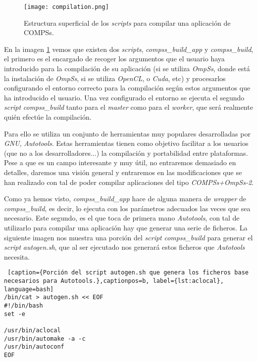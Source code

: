 \bigskip
\begin{figure}[h]
	\centering 
	\caption{Estructura superficial de los \textit{scripts} para compilar una aplicación de COMPSs.}
	\texttt{[image: compilation.png]}
	\label{fig:compilado}
\end{figure}
\par\bigskip

En la imagen \ref{fig:compilado} vemos que existen dos \textit{scripts}, \textit{compss\_build\_app} y \textit{compss\_build}, el primero es el encargado de recoger los argumentos que el usuario haya introducido para la compilación de su aplicación (si se utiliza \textit{OmpSs}, donde está la instalación de \textit{OmpSs}, si se utiliza \textit{OpenCL}, o \textit{Cuda}, etc) y procesarlos configurando el entorno correcto para la compilación según estos argumentos que ha introducido el usuario. Una vez configurado el entorno se ejecuta el segundo \textit{script} \textit{compss\_build} tanto para el \textit{master} como para el \textit{worker}, que será realmente quién efectúe la compilación. 
\par\bigskip
Para ello se utiliza un conjunto de herramientas muy populares desarrolladas por \textit{GNU},  \textit{Autotools}. Estas herramientas tienen como objetivo facilitar a los usuarios (que no a los desarrolladores...) la compilación y portabilidad entre plataformas. Pese a que es un campo interesante y muy útil, no entraremos demasiado en detalles, daremos una visión general y entraremos en las modificaciones que se han realizado con tal de poder compilar aplicaciones del tipo \textit{COMPSs+OmpSs-2}. 
\par\bigskip
Como ya hemos visto, \textit{compss\_build\_app} hace de alguna manera de \textit{wrapper} de \textit{compss\_build}, es decir, lo ejecuta con los parámetros adecuados las veces que sea necesario. Este segundo, es el que toca de primera mano \textit{Autotools}, con tal de utilizarlo para compilar una aplicación hay que generar una serie de ficheros. La siguiente imagen nos muestra una porción del \textit{script}  \textit{compss\_build} para generar el \textit{script} \textit{autogen.sh}, que al ser ejecutado nos generará estos ficheros que \textit{Autotools} necesita.
\bigskip

\begin{minipage}{\linewidth}
\begin{lstlisting} [caption={Porción del script autogen.sh que genera los ficheros base necesarios para Autotools.},captionpos=b, label={lst:aclocal}, language=bash]
/bin/cat > autogen.sh << EOF
#!/bin/bash
set -e

/usr/bin/aclocal
/usr/bin/automake -a -c
/usr/bin/autoconf
EOF       
\end{lstlisting}
\end{minipage}

